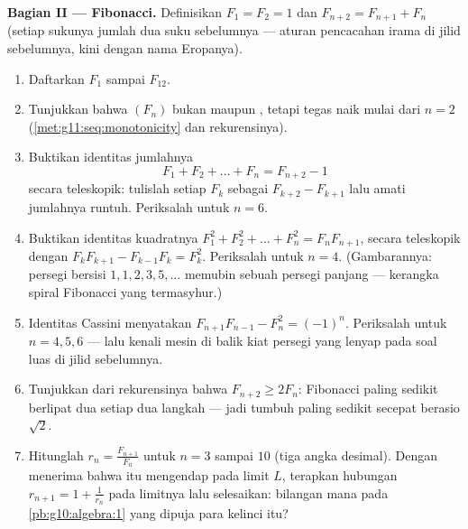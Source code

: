 \begin{problem}
\medskip
\noindent\textbf{Bagian II --- Fibonacci.}
Definisikan $F_1 = F_2 = 1$ dan $F_{n+2} = F_{n+1} + F_n$ (setiap sukunya
jumlah dua suku sebelumnya --- aturan pencacahan irama di jilid
sebelumnya, kini dengan nama Eropanya).
\begin{enumerate}[resume]
  \item Daftarkan $F_1$ sampai $F_{12}$.
  \item Tunjukkan bahwa $(F_n)$ bukan  maupun ,
        tetapi tegas naik mulai dari $n = 2$
        (\cref{met:g11:seq:monotonicity} dan rekurensinya).
  \item Buktikan identitas jumlahnya
        \[
        F_1 + F_2 + \dots + F_n = F_{n+2} - 1
        \]
        secara teleskopik: tulislah setiap $F_k$ sebagai
        $F_{k+2} - F_{k+1}$ lalu amati jumlahnya runtuh. Periksalah
        untuk $n = 6$.
  \item Buktikan identitas kuadratnya
        $F_1^2 + F_2^2 + \dots + F_n^2 = F_n F_{n+1}$,
        secara teleskopik dengan
        $F_k F_{k+1} - F_{k-1} F_k = F_k^2$. Periksalah untuk
        $n = 4$. (Gambarannya: persegi bersisi
        $1, 1, 2, 3, 5, \dots$ memubin sebuah persegi panjang --- kerangka
        spiral Fibonacci yang termasyhur.)
  \item Identitas Cassini menyatakan
        $F_{n+1} F_{n-1} - F_n^2 = (-1)^n$. Periksalah untuk
        $n = 4, 5, 6$ --- lalu kenali mesin di balik
        kiat persegi yang lenyap pada soal luas di jilid
        sebelumnya.
  \item Tunjukkan dari rekurensinya bahwa
        $F_{n+2} \geq 2 F_n$: Fibonacci paling sedikit berlipat dua setiap
        dua langkah --- jadi tumbuh paling sedikit secepat 
        berasio $\sqrt2$.
  \item Hitunglah  $r_n = \frac{F_{n+1}}{F_n}$ untuk
        $n = 3$ sampai $10$ (tiga angka desimal). Dengan menerima bahwa
         itu mengendap pada limit $L$, terapkan hubungan
        $r_{n+1} = 1 + \frac{1}{r_n}$ pada limitnya lalu selesaikan:
        bilangan mana pada \cref{pb:g10:algebra:1} yang dipuja para
        kelinci itu?
\end{enumerate}


\end{problem}
